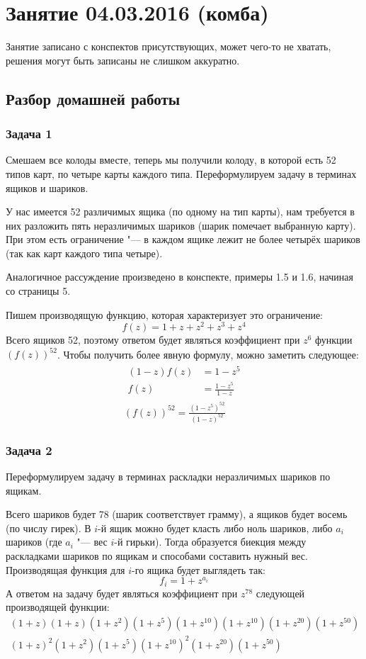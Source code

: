 \chapter{Занятие 04.03.2016 (комба)}
Занятие записано с конспектов присутствующих, может чего-то не хватать, решения могут быть записаны
не слишком аккуратно.

\section{Разбор домашней работы}
\subsection{Задача 1}
	Смешаем все колоды вместе, теперь мы получили колоду, в которой есть 52 типов карт, по четыре карты каждого типа.
	Переформулируем задачу в терминах ящиков и шариков.

	У нас имеется 52 различимых ящика (по одному на тип карты), нам требуется в них разложить пять неразличимых шариков (шарик помечает выбранную карту).
	При этом есть ограничение "--- в каждом ящике лежит не более четырёх шариков (так как карт каждого типа четыре).
	\begin{Rem}
		Аналогичное рассуждение произведено в конспекте, примеры 1.5 и 1.6, начиная со страницы 5.
	\end{Rem}
	Пишем производящую функцию, которая характеризует это ограничение:
	\[
		f(z) = 1 + z + z^2 + z^3 + z^4
	\]
	Всего ящиков 52, поэтому ответом будет являться коэффициент при $z^6$ функции $(f(z))^{52}$.
	Чтобы получить более явную формулу, можно заметить следующее:
	\begin{gather*}
		\begin{aligned}
			(1-z)f(z) &= 1-z^5 \\
			f(z) &= \frac{1-z^5}{1-z}
		\end{aligned} \\
		(f(z))^{52} = \frac{(1-z^5)^{52}}{(1-z)^{52}}
	\end{gather*}

\subsection{Задача 2}
	Переформулируем задачу в терминах раскладки неразличимых шариков по ящикам.
	
	Всего шариков будет 78 (шарик соответствует грамму), а ящиков будет восемь (по числу гирек).
	В $i$-й ящик можно будет класть либо ноль шариков, либо $a_i$ шариков (где $a_i$ "--- вес $i$-й гирьки).
	Тогда образуется биекция между раскладками шариков по ящикам и способами составить нужный вес.
	Производящая функция для $i$-го ящика будет выглядеть так:
	\[ f_i = 1 + z^{a_i} \]
	А ответом на задачу будет являться коэффициент при $z^{78}$ следующей производящей функции:
	\begin{gather*}
		(1+z)(1+z)(1+z^2)(1+z^5)(1+z^{10})(1+z^{10})(1+z^{20})(1+z^{50}) \\
		(1+z)^2(1+z^2)(1+z^5)(1+z^{10})^2(1+z^{20})(1+z^{50}) \\
	\end{gather*}

